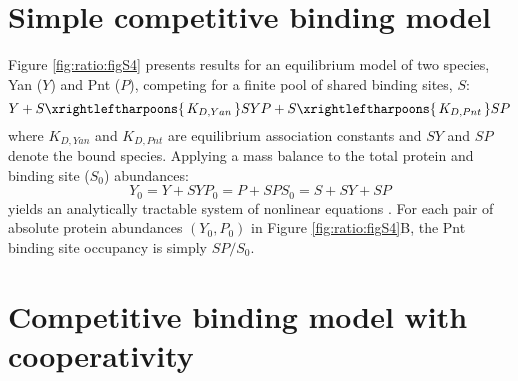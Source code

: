 
\section{Simple competitive binding model}

Figure \ref{fig:ratio:figS4} presents results for an equilibrium model of two species, Yan ($Y$) and Pnt ($P$), competing for a finite pool of shared binding sites, $S$:
\begin{equation}
Y + S \xrightleftharpoons{\,K_{D,Yan}\,} SY
P + S \xrightleftharpoons{\,K_{D,Pnt}\,} SP
\end{equation}
where $K_{D,Yan}$ and $K_{D,Pnt}$ are equilibrium association constants and $SY$ and $SP$ denote the bound species. Applying a mass balance to the total protein and binding site ($S_0$) abundances:
\begin{equation}
Y_0 = Y + SY
P_0 = P + SP
S_0 = S + SY + SP
\end{equation}
yields an analytically tractable system of nonlinear equations \cite{Wang1995}. For each pair of absolute protein abundances $(Y_0,P_0)$ in Figure \ref{fig:ratio:figS4}B, the Pnt binding site occupancy is simply $SP/S_0$.

\section{Competitive binding model with cooperativity}

